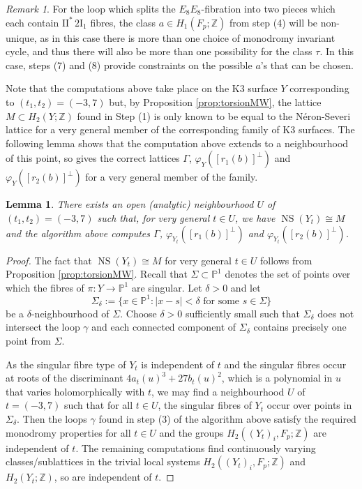 \documentclass[a4paper]{amsart}
\theoremstyle{definition}
\theoremstyle{plain}
\newtheorem{lemma}[definition]{Lemma}
\theoremstyle{remark}
\newtheorem{remark}[definition]{Remark}
\newcommand{\bP}{\mathbb{P}}
\newcommand{\bZ}{\mathbb{Z}}
\newcommand{\rmI}{\mathrm{I}}
\DeclareMathOperator{\NS}{NS}
\numberwithin{figure}{section}
\numberwithin{table}{section}
\begin{document}
\begin{remark}
For the loop which splits the $E_8E_8$-fibration into two pieces which each contain $\rmI\rmI^*\, 2\rmI_1$ fibres, the class $a \in H_1(F_p;\bZ)$ from step (4) will be non-unique, as in this case there is more than one choice of monodromy invariant cycle, and thus there will also be more than one possibility for the class $\tau$. In this case, steps (7) and (8) provide constraints on the possible $a$'s that can be chosen.
\end{remark}

Note that the computations above take place on the K3 surface $Y$ corresponding to $(t_1,t_2) = (-3,7)$ but, by Proposition \ref{prop:torsionMW}, the lattice $M \subset H_2(Y;\bZ)$ found in Step (1) is only known to be equal to the N\'{e}ron-Severi lattice for a very general member of the corresponding family of K3 surfaces. The following lemma shows that the computation above extends to a neighbourhood of this point, so gives the correct lattices $\Gamma$, $\varphi_Y([r_1(b)]^{\perp})$ and $\varphi_Y([r_2(b)]^{\perp})$ for a very general member of the family.

\begin{lemma} \label{lem:deformation} There exists an open (analytic) neighbourhood $U$ of $(t_1,t_2) = (-3,7)$ such that, for very general $t \in U$, we have $\NS(Y_t) \cong M$  and the algorithm above computes $\Gamma$, $\varphi_{Y_t}([r_1(b)]^{\perp})$ and $\varphi_{Y_t}([r_2(b)]^{\perp})$.
\end{lemma}

\begin{proof} The fact that $\NS(Y_t) \cong M$ for very general $t \in U$ follows from Proposition \ref{prop:torsionMW}. Recall that $\Sigma \subset \bP^1$ denotes the set of points over which the fibres of $\pi\colon Y \to \bP^1$ are singular. Let $\delta > 0$ and let 
\[\Sigma_{\delta} := \{x \in \bP^1 : | x - s| < \delta \text{ for some } s \in \Sigma\}\]
be a $\delta$-neighbourhood of $\Sigma$. Choose $\delta > 0$ sufficiently small such that $\Sigma_{\delta}$ does not intersect the loop $\gamma$ and each connected component of $\Sigma_{\delta}$ contains precisely one point from $\Sigma$. 

As the singular fibre type of ${Y}_t$ is independent of $t$ and the singular fibres occur at roots of the discriminant $4a_t(u)^3 + 27b_t(u)^2$, which is a polynomial in $u$ that varies holomorphically with $t$,  we may find a neighbourhood $U$ of $t=(-3,7)$ such that for all $t \in U$, the singular fibres of ${Y}_t$ occur over points in $\Sigma_{\delta}$. Then the loops $\gamma$ found in step (3) of the algorithm above satisfy the required monodromy properties for all $t \in U$ and the groups $H_2(({Y}_t)_i,F_p;\bZ)$ are independent of $t$. The remaining computations find continuously varying classes/sublattices in the trivial local systems $H_2(({Y}_t)_i,F_p;\bZ)$ and $H_2({Y}_t;\bZ)$, so are independent of $t$.
\end{proof}
\end{document}
